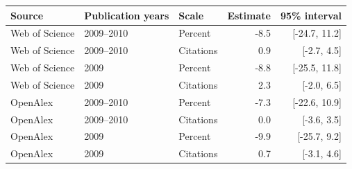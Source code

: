 \begin{tabular}{lllrr}
\toprule
Source & Publication years & Scale & Estimate & 95\% interval \\
\midrule
Web of Science & 2009--2010 & Percent & -8.5 & [-24.7, 11.2] \\
Web of Science & 2009--2010 & Citations & 0.9 & [-2.7, 4.5] \\
Web of Science & 2009 & Percent & -8.8 & [-25.5, 11.8] \\
Web of Science & 2009 & Citations & 2.3 & [-2.0, 6.5] \\
OpenAlex & 2009--2010 & Percent & -7.3 & [-22.6, 10.9] \\
OpenAlex & 2009--2010 & Citations & 0.0 & [-3.6, 3.5] \\
OpenAlex & 2009 & Percent & -9.9 & [-25.7, 9.2] \\
OpenAlex & 2009 & Citations & 0.7 & [-3.1, 4.6] \\
\bottomrule
\end{tabular}
